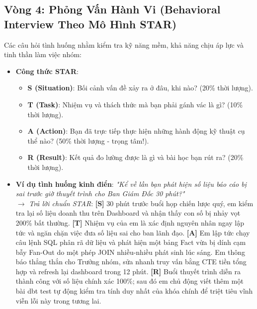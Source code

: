 \subsection{Vòng 4: Phỏng Vấn Hành Vi (Behavioral Interview Theo Mô Hình STAR)}
Các câu hỏi tình huống nhằm kiểm tra kỹ năng mềm, khả năng chịu áp lực và tinh thần làm việc nhóm:
\begin{itemize}
    \item \textbf{Công thức STAR}:
    \begin{itemize}
        \item \textbf{S (Situation)}: Bối cảnh vấn đề xảy ra ở đâu, khi nào? (20\% thời lượng).
        \item \textbf{T (Task)}: Nhiệm vụ và thách thức mà bạn phải gánh vác là gì? (10\% thời lượng).
        \item \textbf{A (Action)}: Bạn đã trực tiếp thực hiện những hành động kỹ thuật cụ thể nào? (50\% thời lượng - trọng tâm!).
        \item \textbf{R (Result)}: Kết quả đo lường được là gì và bài học bạn rút ra? (20\% thời lượng).
    \end{itemize}
    \item \textbf{Ví dụ tình huống kinh điển}: \textit{"Kể về lần bạn phát hiện số liệu báo cáo bị sai trước giờ thuyết trình cho Ban Giám Đốc 30 phút?"} \\
    $\rightarrow$ \textit{Trả lời chuẩn STAR}: \textbf{[S]} 30 phút trước buổi họp chiến lược quý, em kiểm tra lại số liệu doanh thu trên Dashboard và nhận thấy con số bị nhảy vọt 200\% bất thường. \textbf{[T]} Nhiệm vụ của em là xác định nguyên nhân ngay lập tức và ngăn chặn việc đưa số liệu sai cho ban lãnh đạo. \textbf{[A]} Em lập tức chạy câu lệnh SQL phân rã dữ liệu và phát hiện một bảng Fact vừa bị dính cạm bẫy Fan-Out do một phép JOIN nhiều-nhiều phát sinh lúc sáng. Em thông báo thẳng thắn cho Trưởng nhóm, sửa nhanh truy vấn bằng CTE tiền tổng hợp và refresh lại dashboard trong 12 phút. \textbf{[R]} Buổi thuyết trình diễn ra thành công với số liệu chính xác 100\%; sau đó em chủ động viết thêm một bài dbt test tự động kiểm tra tính duy nhất của khóa chính để triệt tiêu vĩnh viễn lỗi này trong tương lai.
\end{itemize}

